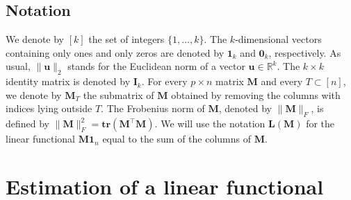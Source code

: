 \documentclass[sts,preprint,reqno,a4paper]{imsart}
\def\RR{\mathbb R}
\def\bL{\boldsymbol L}
\def\bfM{\mathbf M}
\def\bfI{\mathbf I}
\def\bu{\boldsymbol u}
\def\trace{\mathbf{tr}}
\theoremstyle{plain}
\theoremstyle{remark}
\theoremstyle{definition}
\begin{document}
\subsection{Notation}
We denote by $[k]$ the set of integers $\{1,\ldots,k\}$. The $k$-dimensional
vectors containing only ones and only zeros are denoted by $\mathbf1_k$ and
$\mathbf 0_k$, respectively. As usual, $\|\bu\|_2$ stands for the Euclidean norm
of a vector $\bu\in\RR^k$. The $k\times k$ identity matrix is denoted by $\bfI_k$.
For every $p\times n$ matrix $\bfM$ and every $T\subset [n]$, we denote by $\bfM_T$
the submatrix of $\bfM$ obtained by removing the columns with indices lying outside
$T$. The Frobenius norm of $\bfM$, denoted by $\|\bfM\|_F$, is defined by
$\|\bfM\|_F^2 = \trace(\bfM^\top\bfM)$. We will use the notation $\bL(\bfM)$ for
the linear functional $\bfM\mathbf 1_n$ equal to the sum of the columns of $\bfM$.


\section{Estimation of a linear functional}\label{section_linear}
\end{document}

